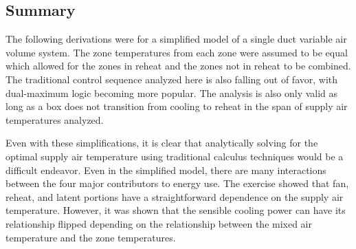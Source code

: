 \subsection{Summary}

The following derivations were for a simplified model of a single duct
variable air volume system. The zone temperatures from each zone were
assumed to be equal which allowed for the zones in reheat and the zones
not in reheat to be combined. The traditional control sequence analyzed
here is also falling out of favor, with dual-maximum logic becoming more
popular. The analysis is also only valid as long as a box does not
transition from cooling to reheat in the span of supply air temperatures
analyzed. 

Even with these simplifications, it is clear that analytically solving
for the optimal supply air temperature using traditional calculus
techniques would be a difficult endeavor. Even in the simplified model, there are
many interactions between the four major contributors to energy use. The
exercise showed that fan, reheat, and latent portions have a
straightforward dependence on the supply air temperature. However, it
was shown that the sensible cooling power can have its relationship
flipped depending on the relationship between the mixed air temperature
and the zone temperatures. 

